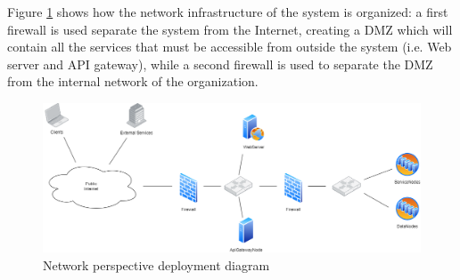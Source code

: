 Figure \ref{deployment_net_diagram} shows how the network infrastructure of the system is organized: a first firewall is used separate the system from the Internet, creating a DMZ which will contain all the services that must be accessible from outside the system (i.e. Web server and API gateway), while a second firewall is used to separate the DMZ from the internal network of the organization.\\
\begin{figure}[H]
    \includegraphics[width=1\textwidth]{Diagrams/deployment_network_diagram.png}
    \caption{Network perspective deployment diagram}
    \label{deployment_net_diagram}
\end{figure}

